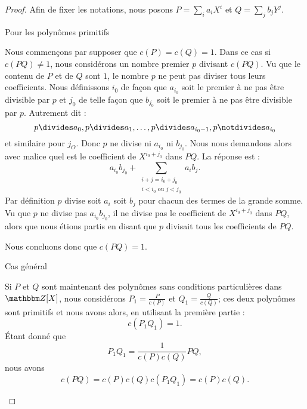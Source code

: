 \begin{proof}
    
    Afin de fixer les notations, nous posons \( P=\sum_ia_iX^i\) et \( Q=\sum_jb_jY^j\).
    
    \begin{subproof}
        \item[Pour les polynômes primitifs]
    
            Nous commençons par supposer que \( c(P)=c(Q)=1\). Dans ce cas si \( c(PQ)\neq 1\), nous considérons un nombre premier \( p\) divisant \( c(PQ)\). Vu que le contenu de \( P\) et de \( Q\) sont \( 1\), le nombre \( p\) ne peut pas diviser tous leurs coefficients. Nous définissons \( i_0\) de façon que \( a_{i_0}\) soit le premier à ne pas être divisible par \( p\) et \( j_0\) de telle façon que \( b_{j_0}\) soit le premier à ne pas être divisible par \( p\). Autrement dit :
            \begin{equation}
                p\divides a_0,p\divides a_1,\ldots,p\divides a_{i_0-1},p\notdivides a_{i_0}
            \end{equation}
            et similaire pour \( j_O\). Donc \( p\) ne divise ni \( a_{i_0}\) ni \( b_{j_0}\). Nous nous demandons alors avec malice quel est le coefficient de \( X^{i_0+j_0}\) dans \( PQ\). La réponse est :
            \begin{equation}
                a_{i_0}b_{j_0}+\sum_{\substack{i+j=i_0+j_0\\i<i_0\text{ ou }j<j_0}}a_ib_j.
            \end{equation}
            Par définition \( p\) divise soit \( a_i\) soit \( b_j\) pour chacun des termes de la grande somme. Vu que \( p\) ne divise pas \( a_{i_0}b_{j_0}\), il ne divise pas le coefficient de \( X^{i_0+j_0}\) dans \( PQ\), alors que nous étions partis en disant que \( p\) divisait tous les coefficients de \( PQ\).

            Nous concluons donc que \( c(PQ)=1\).

        \item[Cas général]

            Si \( P\) et \( Q\) sont maintenant des polynômes sans conditions particulières dans \( \eZ[X]\), nous considérons \( P_1=\frac{ P }{ c(P) }\) et \( Q_1=\frac{ Q }{ c(Q) }\); ces deux polynômes sont primitifs et nous avons alors, en utilisant la première partie :
            \begin{equation}
                c(P_1Q_1)=1.
            \end{equation}
            Étant donné que
            \begin{equation}
                P_1Q_1=\frac{1}{ c(P)c(Q) }PQ,
            \end{equation}
            nous avons
            \begin{equation}
                c(PQ)=c(P)c(Q)c(P_1Q_1)=c(P)c(Q).
            \end{equation}
    \end{subproof}
\end{proof}

